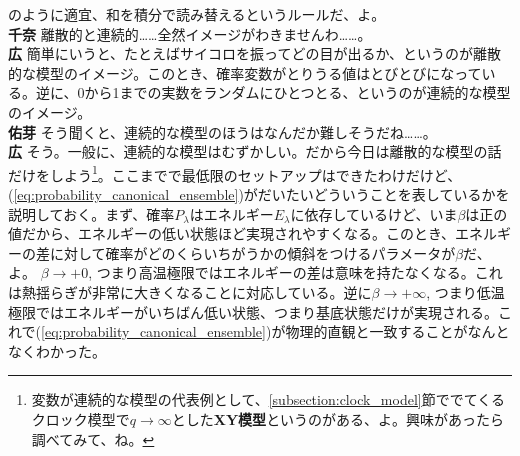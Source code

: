 \documentclass[paper=b5j,fontsize=12Q,jafontsize=12Q,baselineskip=21Q]{jlreq}
\DeclareRobustCommand{\hiron}{\textbf{広 }}
\DeclareRobustCommand{\chinan}{\textbf{千奈 }}
\DeclareRobustCommand{\umen}{\textbf{佑芽 }}
\begin{document}
\begin{refsection}
のように適宜、和を積分で読み替えるというルールだ、よ。
\\\chinan 離散的と連続的……全然イメージがわきませんわ……。
\\\hiron 簡単にいうと、たとえばサイコロを振ってどの目が出るか、というのが離散的な模型のイメージ。このとき、確率変数がとりうる値はとびとびになっている。逆に、0から1までの実数をランダムにひとつとる、というのが連続的な模型のイメージ。
\\\umen そう聞くと、連続的な模型のほうはなんだか難しそうだね……。
\\\hiron そう。一般に、連続的な模型はむずかしい。だから今日は離散的な模型の話だけをしよう\footnote{変数が連続的な模型の代表例として、\ref{subsection:clock_model}節ででてくるクロック模型で$q\to\infty$とした\textbf{XY模型}というのがある、よ。興味があったら調べてみて、ね。}。ここまでで最低限のセットアップはできたわけだけど、(\ref{eq:probability_canonical_ensemble})がだいたいどういうことを表しているかを説明しておく。まず、確率$P_\lambda$はエネルギー$E_\lambda$に依存しているけど、いま$\beta$は正の値だから、エネルギーの低い状態ほど実現されやすくなる。このとき、エネルギーの差に対して確率がどのくらいちがうかの傾斜をつけるパラメータが$\beta$だ、よ。 $\beta\to+0$, つまり高温極限ではエネルギーの差は意味を持たなくなる。これは熱揺らぎが非常に大きくなることに対応している。逆に$\beta\to+\infty$, つまり低温極限ではエネルギーがいちばん低い状態、つまり基底状態だけが実現される。これで(\ref{eq:probability_canonical_ensemble})が物理的直観と一致することがなんとなくわかった。


\end{refsection}
\end{document}
